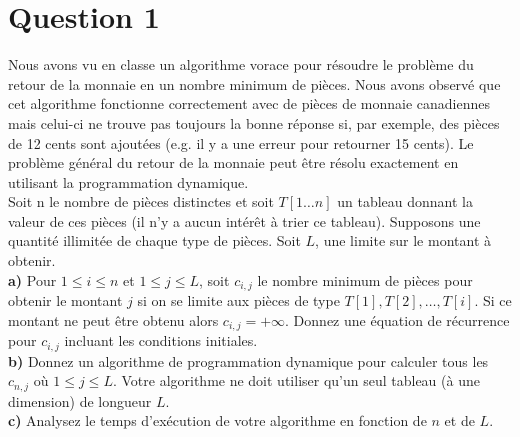 \documentclass[devoir3.tex]{subfiles}
\begin{document}
\section*{Question 1}
Nous avons vu en classe un algorithme vorace pour résoudre le problème du retour de la monnaie en un nombre minimum de pièces. Nous avons observé que cet algorithme fonctionne correctement avec de pièces de monnaie canadiennes mais celui-ci ne trouve pas toujours la bonne réponse si, par exemple, des pièces de 12 cents sont ajoutées (e.g. il y a une erreur pour retourner 15 cents). Le problème général du retour de la monnaie peut être résolu exactement en utilisant la programmation dynamique. \\[0.2cm]
Soit n le nombre de pièces distinctes et soit \(T[1 \dots n]\) un tableau donnant la valeur de ces pièces (il n’y a aucun intérêt à trier ce tableau). Supposons une quantité illimitée de chaque type de pièces. Soit \(L\), une limite sur le montant à obtenir. \\

\textbf{a)} Pour \(1 \leq i \leq n\) et \(1 \leq j \leq L\), soit \(c_{i,j}\) le nombre minimum de pièces pour obtenir le montant \(j\) si on se limite aux pièces de type \(T[1], T[2], \dots , T[i]\). Si ce montant ne peut être obtenu alors \(c_{i,j} = +\infty \). Donnez une équation de récurrence pour \(c_{i,j}\) incluant les conditions initiales. \\

\textbf{b)} Donnez un algorithme de programmation dynamique pour calculer tous les \(c_{n,j}\) où \(1 \leq j \leq L\). Votre algorithme ne doit utiliser qu’un seul tableau (à une dimension) de longueur \(L\). \\

\textbf{c)} Analysez le temps d’exécution de votre algorithme en fonction de \(n\)
et de \(L\).
\end{document}
